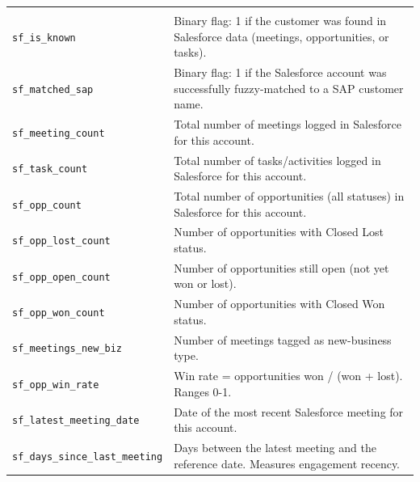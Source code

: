 \documentclass{article}
\begin{document}
\begin{longtable}{@{}p{5.4cm} p{10.6cm}@{}}
\rowcolor{gray!20} \multicolumn{2}{@{}l}{\textit{Salesforce engagement}} \\
\texttt{sf\_\allowbreak is\_\allowbreak known} & Binary flag: 1 if the customer was found in Salesforce data (meetings, opportunities, or tasks). \\
\texttt{sf\_\allowbreak matched\_\allowbreak sap} & Binary flag: 1 if the Salesforce account was successfully fuzzy-matched to a SAP customer name. \\
\texttt{sf\_\allowbreak meeting\_\allowbreak count} & Total number of meetings logged in Salesforce for this account. \\
\texttt{sf\_\allowbreak task\_\allowbreak count} & Total number of tasks/activities logged in Salesforce for this account. \\
\texttt{sf\_\allowbreak opp\_\allowbreak count} & Total number of opportunities (all statuses) in Salesforce for this account. \\
\texttt{sf\_\allowbreak opp\_\allowbreak lost\_\allowbreak count} & Number of opportunities with Closed Lost status. \\
\texttt{sf\_\allowbreak opp\_\allowbreak open\_\allowbreak count} & Number of opportunities still open (not yet won or lost). \\
\texttt{sf\_\allowbreak opp\_\allowbreak won\_\allowbreak count} & Number of opportunities with Closed Won status. \\
\texttt{sf\_\allowbreak meetings\_\allowbreak new\_\allowbreak biz} & Number of meetings tagged as new-business type. \\
\texttt{sf\_\allowbreak opp\_\allowbreak win\_\allowbreak rate} & Win rate = opportunities won / (won + lost). Ranges 0-1. \\
\texttt{sf\_\allowbreak latest\_\allowbreak meeting\_\allowbreak date} & Date of the most recent Salesforce meeting for this account. \\
\texttt{sf\_\allowbreak days\_\allowbreak since\_\allowbreak last\_\allowbreak meeting} & Days between the latest meeting and the reference date. Measures engagement recency. \\


\end{longtable}
\end{document}
